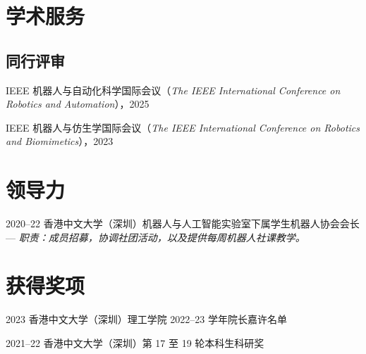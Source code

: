 \documentclass[utf8, 11pt,letterpaper]{report}
\newcommand{\listitemspace}{0.25em}
\renewenvironment{itemize}
{\begin{list}{}{\setlength{\leftmargin}{0em}
			\setlength{\parskip}{0em}
			\setlength{\itemsep}{\listitemspace}
			\setlength{\parsep}{\listitemspace}}}
	{\end{list}}
\begin{document}
\section*{学术服务}
\subsection*{同行评审}
\begin{itemize}
\item IEEE 机器人与自动化科学国际会议（\textit{The IEEE International Conference on Robotics and Automation}），2025
\item IEEE 机器人与仿生学国际会议（\textit{The IEEE International Conference on Robotics and Biomimetics}），2023 
\end{itemize}
	
	
\section*{领导力}
\begin{tablist}
	\item[2020--22]   \tab 香港中文大学（深圳）机器人与人工智能实验室下属学生机器人协会会长 --- \textit{职责：成员招募，协调社团活动，以及提供每周机器人社课教学。}
\end{tablist}
	
\section*{获得奖项}
\begin{tablist}
	\item[2023]   \tab 香港中文大学（深圳）理工学院 2022--23 学年院长嘉许名单
	\item[2021--22]   \tab 香港中文大学（深圳）第 17 至 19 轮本科生科研奖
\end{tablist}
	
\end{document}
